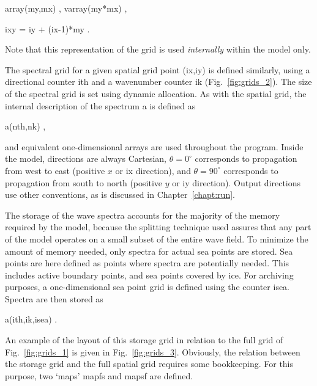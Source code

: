 \vspace{\baselineskip}
\centerline{\F array(my,mx) , varray(my*mx) ,}
\centerline{\F ixy = iy + (ix-1)*my .}
\vspace{\baselineskip}

\noindent
Note that this representation of the grid is used {\it internally} within the
model only.




The spectral grid for a given spatial grid point {\F (ix,iy)} is defined
similarly, using a directional counter {\F ith} and a wavenumber counter {\F
ik} (Fig.~\ref{fig:grids_2}). The size of the spectral grid is set using
dynamic allocation. As with the spatial grid, the internal description of the
spectrum {\F a} is defined as

\vspace{\baselineskip}
\centerline{\F a(nth,nk) ,}
\vspace{\baselineskip}

\noindent
and equivalent one-dimensional arrays are used throughout the program. Inside
the model, directions are always Cartesian, $\theta = 0^\circ$ corresponds to
propagation from west to east (positive $x$ or {\F ix} direction), and $\theta
= 90^\circ$ corresponds to propagation from south to north (positive $y$ or
{\F iy} direction). Output directions use other conventions, as is discussed
in Chapter~\ref{chapt:run}.

The storage of the wave spectra accounts for the majority of the memory
required by the model, because the splitting technique used assures that any
part of the model operates on a small subset of the entire wave field. To
minimize the amount of memory needed, only spectra for actual sea points are
stored. Sea points are here defined as points where spectra are potentially
needed. This includes active boundary points, and sea points covered by
ice. For archiving purposes, a one-dimensional sea point grid is defined using
the counter {\F isea}. Spectra are then stored as

\vspace{\baselineskip}
\centerline{\F a(ith,ik,isea) .}
\vspace{\baselineskip}

\noindent
An example of the layout of this storage grid in relation to the full grid of
Fig.~\ref{fig:grids_1} is given in Fig.~\ref{fig:grids_3}. Obviously, the
relation between the storage grid and the full spatial grid requires some
bookkeeping. For this purpose, two `maps' {\F mapfs} and {\F mapsf} are
defined.

